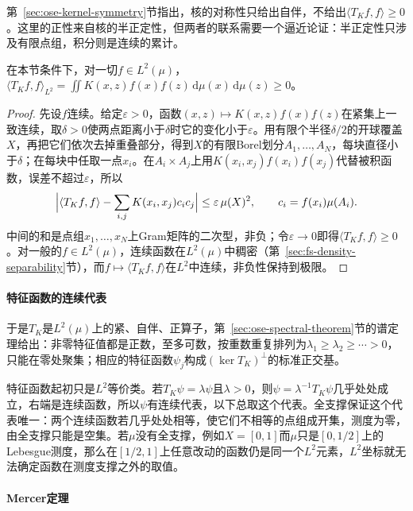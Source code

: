 第~\ref{sec:ose-kernel-symmetry}节指出，核的对称性只给出自伴，不给出$\langle T_Kf,f\rangle\ge0$。这里的正性来自核的半正定性，但两者的联系需要一个逼近论证：半正定性只涉及有限点组，积分则是连续的累计。

\begin{lemma}[半正定连续核给出正算子]
\label{lem:rkhs-positive-operator}
在本节条件下，对一切$f\in L^2(\mu)$，$\langle T_Kf,f\rangle_{L^2}=\iint K(x,z)f(x)f(z)\,\mathrm d\mu(x)\,\mathrm d\mu(z)\ge0$。
\end{lemma}

\begin{proof}
先设$f$连续。给定$\varepsilon>0$，函数$(x,z)\mapsto K(x,z)f(x)f(z)$在紧集上一致连续，取$\delta>0$使两点距离小于$\delta$时它的变化小于$\varepsilon$。用有限个半径$\delta/2$的开球覆盖$X$，再把它们依次去掉重叠部分，得到$X$的有限Borel划分$A_1,\ldots,A_N$，每块直径小于$\delta$；在每块中任取一点$x_i$。在$A_i\times A_j$上用$K(x_i,x_j)f(x_i)f(x_j)$代替被积函数，误差不超过$\varepsilon$，所以
\[
\Bigl|\langle T_Kf,f\rangle-\sum_{i,j}K(x_i,x_j)c_ic_j\Bigr|\le\varepsilon\,\mu(X)^2,\qquad c_i=f(x_i)\mu(A_i).
\]
中间的和是点组$x_1,\ldots,x_N$上Gram矩阵的二次型，非负；令$\varepsilon\to0$即得$\langle T_Kf,f\rangle\ge0$。对一般的$f\in L^2(\mu)$，连续函数在$L^2(\mu)$中稠密（第~\ref{sec:fs-density-separability}节），而$f\mapsto\langle T_Kf,f\rangle$在$L^2$中连续，非负性保持到极限。
\end{proof}

\paragraph{特征函数的连续代表}

于是$T_K$是$L^2(\mu)$上的紧、自伴、正算子，第~\ref{sec:ose-spectral-theorem}节的谱定理给出：非零特征值都是正数，至多可数，按重数重复排列为$\lambda_1\ge\lambda_2\ge\cdots>0$，只能在零处聚集；相应的特征函数$\psi_j$构成$(\ker T_K)^\perp$的标准正交基。

特征函数起初只是$L^2$等价类。若$T_K\psi=\lambda\psi$且$\lambda>0$，则$\psi=\lambda^{-1}T_K\psi$几乎处处成立，右端是连续函数，所以$\psi$有连续代表，以下总取这个代表。全支撑保证这个代表唯一：两个连续函数若几乎处处相等，使它们不相等的点组成开集，测度为零，由全支撑只能是空集。若$\mu$没有全支撑，例如$X=[0,1]$而$\mu$只是$[0,1/2]$上的Lebesgue测度，那么在$[1/2,1]$上任意改动的函数仍是同一个$L^2$元素，$L^2$坐标就无法确定函数在测度支撑之外的取值。

\paragraph{Mercer定理}

